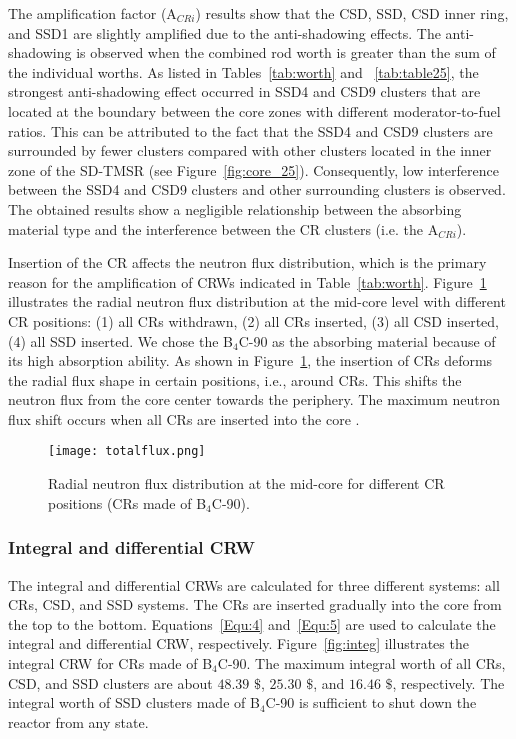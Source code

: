 The amplification factor (A$_{CRi}$) results show that the CSD, SSD, CSD inner 
ring, and SSD1 are slightly amplified due to the anti-shadowing effects. The 
anti-shadowing is observed when the combined rod worth is greater than the sum 
of the individual worths. As listed in Tables~\ref{tab:worth} and ~\ref{tab:table25}, the strongest anti-shadowing effect occurred in 
SSD4 and CSD9 clusters that are located at the boundary between the core zones 
with different moderator-to-fuel ratios. This can be attributed to the fact that the SSD4 and CSD9 clusters are surrounded by fewer clusters compared with other clusters located in the inner zone of the SD-TMSR (see Figure~\ref{fig:core_25}). Consequently, low interference between the SSD4 and CSD9 clusters and other surrounding clusters is observed. The obtained results show a negligible relationship between the absorbing material type and the interference between the CR clusters (i.e. the A$_{CRi}$).

Insertion of the CR affects the neutron flux distribution, which is 
the primary reason for the amplification of CRWs indicated in 
Table~\ref{tab:worth}. Figure~\ref{fig:totalflux} illustrates the radial 
neutron flux distribution at the mid-core level with different CR positions: 
(1) all CRs withdrawn, (2) all CRs inserted, (3) all CSD inserted, (4) all SSD 
inserted. We chose the B$_4$C-90 as the absorbing material because of its high 
absorption ability. As shown in Figure~\ref{fig:totalflux}, the insertion of 
CRs deforms the radial flux shape in certain positions, i.e., around CRs.
This shifts the neutron flux from the core center towards the 
periphery. The maximum neutron flux shift occurs when all CRs are inserted 
into the core \cite{girardin2007control}.
\begin{figure}[!ht]
	\centering
	\texttt{[image: totalflux.png]}
	\vspace{-0.5in}
	\caption{Radial neutron flux distribution at the mid-core for different 
	CR positions (CRs made of B$_4$C-90).} 
	\label{fig:totalflux}
\end{figure}
 

\subsubsection{Integral and differential CRW}

The integral and differential CRWs are calculated for three 
different systems: all CRs, CSD, and SSD systems. The CRs are 
inserted gradually into the core from the top to the bottom. 
Equations~\ref{Equ:4} and~\ref{Equ:5} are used to calculate the integral and 
differential CRW, respectively. Figure~\ref{fig:integ} illustrates the integral CRW for CRs 
made of B$_4$C-90. The maximum integral worth of all CRs, CSD, and SSD 
clusters are about $48.39$ $\$$, $25.30$ $\$$, and $16.46$ $\$$, respectively. The 
integral worth of SSD clusters made of B$_4$C-90 is sufficient to shut down the reactor from any 
state.

